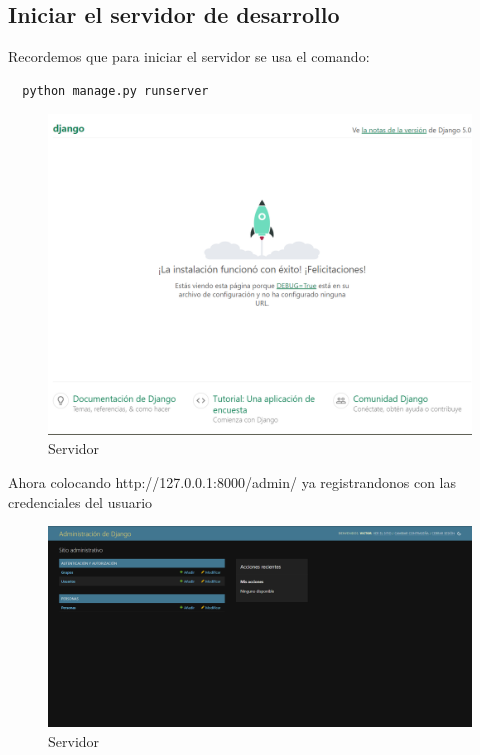 \documentclass{article}
\begin{document}
  \subsection{Iniciar el servidor de desarrollo}
  Recordemos que para iniciar el servidor se usa el comando:
  \begin{lstlisting}
  python manage.py runserver
  \end{lstlisting}
  \begin{figure}[H]
    \centering
    \includegraphics[width=1\textwidth, keepaspectratio]{img/ejecutar.png}
    \caption{Servidor}
  \end{figure}
  \newpage
  Ahora colocando http://127.0.0.1:8000/admin/ ya registrandonos con las credenciales del usuario
  \begin{figure}[H]
    \centering
    \includegraphics[width=1\textwidth, keepaspectratio]{img/ejecutar1.png}
    \caption{Servidor}
  \end{figure}
    
	
\end{document}
